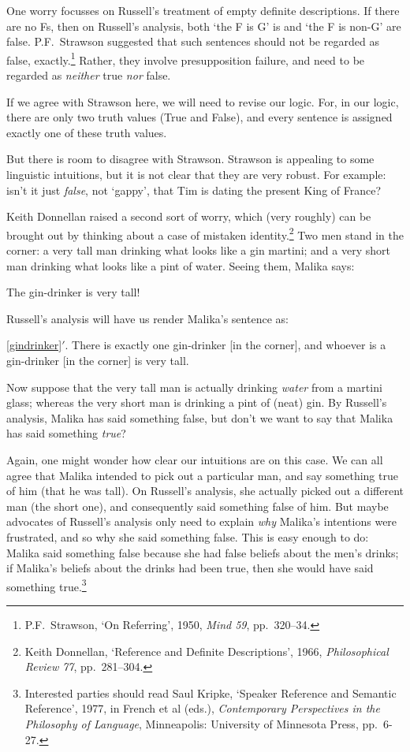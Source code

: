 One worry focusses on Russell's treatment of empty definite descriptions. If there are no Fs, then on Russell's analysis, both `the F is G' is and  `the F is non-G' are false. P.F.\ Strawson suggested that such sentences should not be regarded as false, exactly.\footnote{P.F.\ Strawson, `On Referring', 1950, \emph{Mind 59}, pp.\ 320--34.} Rather, they involve presupposition failure, and need to be regarded as \emph{neither} true \emph{nor} false.

If we agree with Strawson here, we will need to revise our logic. For, in our logic, there are only two truth values (True and False), and every sentence is assigned exactly one of these truth values.

But there is room to disagree with Strawson. Strawson is appealing to some linguistic intuitions, but it is not clear that they are very robust. For example: isn't it just \emph{false}, not `gappy', that Tim is dating the present King of France?

Keith Donnellan raised a second sort of worry, which (very roughly) can be brought out by thinking about a case of mistaken identity.\footnote{Keith Donnellan, `Reference and Definite Descriptions', 1966, \emph{Philosophical Review 77}, pp.\ 281--304.} Two men stand in the corner: a very tall man drinking what looks like a gin martini; and a very short man drinking what looks like a pint of water. Seeing them, Malika says:
	\begin{earg}
		\item[\ex{gindrinker}] The gin-drinker is very tall!
	\end{earg}
Russell's analysis will have us render Malika's sentence as:
	\begin{earg}
		\item[\ref{gindrinker}$'$.] There is exactly one gin-drinker [in the corner], and whoever is a gin-drinker [in the corner] is very tall.
	\end{earg}
Now suppose that the very tall man is actually drinking \emph{water} from a martini glass; whereas the very short man is drinking a pint of (neat) gin. By Russell's analysis, Malika has said something false, but don't we want to say that Malika has said something \emph{true}?

Again, one might wonder how clear our intuitions are on this case. We can all agree that Malika intended to pick out a particular man, and say something true of him (that he was tall). On Russell's analysis, she actually picked out a different man (the short one), and consequently said something false of him. But  maybe advocates of Russell's analysis only need to explain \emph{why} Malika's intentions were frustrated, and so why she said something false. This is easy enough to do:  Malika said something false because she had false beliefs about the men's drinks; if Malika's beliefs about the drinks had been true,  then she would have said something true.\footnote{Interested parties should read Saul Kripke, `Speaker Reference and Semantic Reference', 1977, in French et al (eds.), \emph{Contemporary Perspectives in the Philosophy of Language}, Minneapolis: University of Minnesota Press, pp.\ 6-27.}

